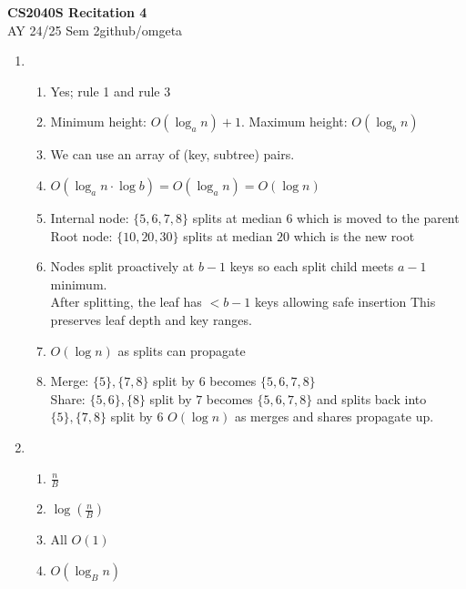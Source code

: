 \documentclass[12pt, a4paper]{article}
\newcommand{\mytitle}{CS2040S Recitation 4}
\newcommand{\myauthor}{github/omgeta}
\newcommand{\mydate}{AY 24/25 Sem 2}
\begin{document}
\raggedright
\footnotesize
\begin{center}
{\normalsize{\textbf{\mytitle}}} \\
{\footnotesize{\mydate\hspace{2pt}\textemdash\hspace{2pt}\myauthor}}
\end{center}
\begin{enumerate}[Q\arabic*.]
  \item 
    \begin{enumerate}[(\alph*.)]
      \item Yes; rule 1 and rule 3 

      \item Minimum height: $O(\log_an) + 1$. Maximum height: $O(\log_bn)$

      \item We can use an array of (key, subtree) pairs. 

      \item $O(\log_an \cdot \log b) = O(\log_an) = O(\log n)$ 

      \item Internal node: $\{5, 6, 7, 8\}$ splits at median $6$ which is moved to the parent\\
        Root node: $\{10, 20, 30\}$ splits at median $20$ which is the new root

      \item Nodes split proactively at $b-1$ keys so each split child meets $a-1$ minimum.\\
        After splitting, the leaf has $< b-1$ keys allowing safe insertion
        This preserves leaf depth and key ranges.

      \item $O(\log n)$ as splits can propagate 

      \item Merge: $\{5\}, \{7, 8\}$ split by $6$ becomes $\{5, 6, 7, 8\}$\\
        Share: $\{5, 6\}, \{8\}$ split by $7$ becomes $\{5, 6, 7, 8\}$ and splits back into $\{5\}, \{7, 8\}$ split by $6$
        $O(\log n)$ as merges and shares propagate up.
    \end{enumerate}

  \item 
    \begin{enumerate}[(\alph*.)]
      \item $\frac{n}{B}$

      \item $\log(\frac{n}{B})$

      \item All $O(1)$

      \item $O(\log_Bn)$
    \end{enumerate}
\end{enumerate}
\end{document}

